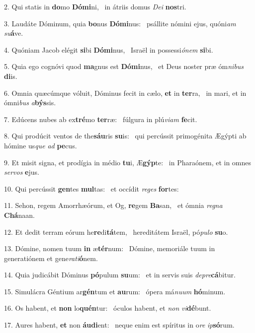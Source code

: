 2. Qui statis in \textbf{do}mo \textbf{Dó}\textbf{mi}ni, \ast\  in átriis domus \textit{De}\textit{i} \textbf{nos}tri.\

3. Laudáte Dóminum, quia \textbf{bo}nus \textbf{Dó}\textbf{mi}nus: \ast\  psállite nómini ejus, quóni\textit{am} \textit{su}\textbf{á}ve.\

4. Quóniam Jacob elégit \textbf{si}bi \textbf{Dó}\textbf{mi}nus, \ast\  Israël in possessi\textit{ó}\textit{nem} \textbf{si}bi.\

5. Quia ego cognóvi quod \textbf{ma}gnus est \textbf{Dó}\textbf{mi}nus, \ast\  et Deus noster præ óm\textit{ni}\textit{bus} \textbf{di}is.\

6. Omnia quæcúmque vóluit, Dóminus fecit in cælo, \textbf{et} in \textbf{ter}ra, \ast\  in mari, et in ómni\textit{bus} \textit{a}\textbf{býs}sis.\

7. Edúcens nubes ab ex\textbf{tré}mo \textbf{ter}ræ: \ast\  fúlgura in plú\textit{vi}\textit{am} \textbf{fe}cit.\

8. Qui prodúcit ventos de the\textbf{sáu}ris \textbf{su}is: \ast\  qui percússit primogénita Ægýpti ab hómine us\textit{que} \textit{ad} \textbf{pe}cus.\

9. Et misit signa, et prodígia in médio \textbf{tu}i, Æ\textbf{gýp}te: \ast\  in Pharaónem, et in omnes \textit{ser}\textit{vos} \textbf{e}jus.\

10. Qui percússit \textbf{gen}tes \textbf{mul}tas: \ast\  et occídit \textit{re}\textit{ges} \textbf{for}tes:\

11. Sehon, regem Amorrhæórum, et Og, \textbf{re}gem \textbf{Ba}san, \ast\  et ómnia \textit{re}\textit{gna} \textbf{Chá}naan.\

12. Et dedit terram eórum he\textbf{re}di\textbf{tá}tem, \ast\  hereditátem Israël, pó\textit{pu}\textit{lo} \textbf{su}o.\

13. Dómine, nomen tuum \textbf{in} æ\textbf{tér}num: \ast\  Dómine, memoriále tuum in generatiónem et gene\textit{ra}\textit{ti}\textbf{ó}nem.\

14. Quia judicábit Dóminus \textbf{pó}pulum \textbf{su}um: \ast\  et in servis suis \textit{de}\textit{pre}\textbf{cá}bitur.\

15. Simulácra Géntium ar\textbf{gén}tum et \textbf{au}rum: \ast\  ópera má\textit{nu}\textit{um} \textbf{hó}minum.\

16. Os habent, et \textbf{non} lo\textbf{quén}tur: \ast\  óculos habent, et \textit{non} \textit{vi}\textbf{dé}bunt.\

17. Aures habent, \textbf{et} non \textbf{áu}\textbf{di}ent: \ast\  neque enim est spíritus in o\textit{re} \textit{ip}\textbf{só}rum.\

